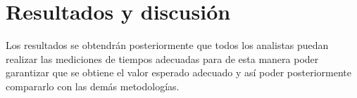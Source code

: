     
    
    
    
    
    
    \section{Resultados y discusión}
    
    Los resultados se obtendrán posteriormente que todos los analistas puedan realizar las mediciones de tiempos adecuadas para de esta manera poder garantizar que se obtiene el valor esperado adecuado y así poder posteriormente compararlo con las demás metodologías.
    
    
